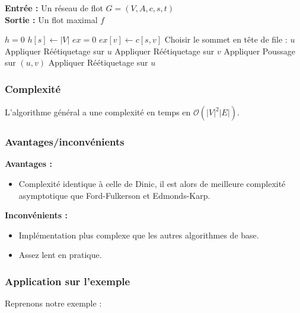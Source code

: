 \documentclass[a4paper]{article}
\begin{document}
\begin{algorithm}[H]
	\caption{Algorithme de Poussage-Réétiquetage}
	\textbf{Entrée :} Un réseau de flot $G = (V, A, c, s, t)$ \\
	\textbf{Sortie :} Un flot maximal $f$
	\begin{algorithmic}[1]
		\State $h = ${$0 $}
		\State $h[s] \gets |V|$
		\State $ex = ${$0 $}
			\State $ex[v] \gets c[s,v]$
		\EndFor
			\State Choisir le sommet en tête de file : $u$
			\State Appliquer Réétiquetage sur $u$
				\State Appliquer Réétiquetage sur $v$
					\State Appliquer Poussage sur $(u,v)$
				\EndIf
			\EndFor
			\State Appliquer Réétiquetage sur $u$
		\EndWhile
		
	\end{algorithmic}
\end{algorithm}

\subsubsection{Complexité}

L'algorithme général a une complexité en temps en $\mathcal{O} (|V|^{2}|E|)$.

\subsubsection{Avantages/inconvénients}
\textbf{Avantages :}
\begin{itemize}
	\item Complexité identique à celle de Dinic, il est alors de meilleure complexité asymptotique que Ford-Fulkerson et Edmonds-Karp.
\end{itemize}

\textbf{Inconvénients :}
\begin{itemize}
	\item Implémentation plus complexe que les autres algorithmes de base.
	\item Assez lent en pratique.
\end{itemize}

\subsubsection{Application sur l'exemple}
Reprenons notre exemple :
\end{document}
